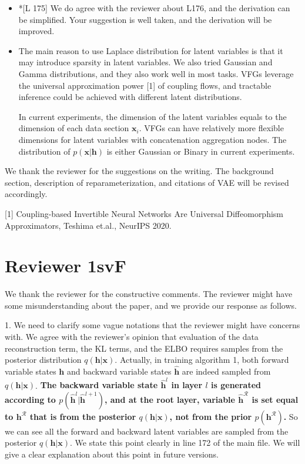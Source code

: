 \documentclass{article}
\begin{document}
\begin{itemize}
\item *[L 175] We do agree with the reviewer about L176, and the derivation can be simplified.  Your suggestion is well taken, and the derivation will be improved. 


\item The main reason to use Laplace distribution for latent variables is that it may introduce sparsity in latent variables. We also tried Gaussian and Gamma distributions, and they also work well in most tasks. VFGs leverage the universal approximation power [1] of coupling flows, and tractable inference could be achieved with different latent distributions. 

In current experiments, the dimension of the latent variables equals to the dimension of each data section $\mathbf{x}_i$. VFGs can have relatively more flexible dimensions for latent variables with concatenation aggregation nodes.  The distribution of $p(\mathbf{x}|\mathbf{h})$ is either Gaussian or Binary in current experiments. 

\end{itemize}

We thank the reviewer for the suggestions on the writing. The background section, description of reparameterization, and citations of VAE will be revised accordingly. 


[1] Coupling-based Invertible Neural Networks Are Universal Diffeomorphism Approximators, Teshima et.al., NeurIPS 2020.

\section{Reviewer 1svF}

We thank the reviewer for the constructive comments. The reviewer might have some misunderstanding about the paper, and we provide our response as follows. 

1. We need to clarify some vague notations that the reviewer might have concerns with.    We agree with the reviewer's opinion that evaluation of the data reconstruction term, the KL terms, and the ELBO  requires samples from the posterior distribution $q(\mathbf{h}|\mathbf{x})$. 
Actually, in training algorithm 1, both forward variable states $\mathbf{h}$ and backward variable states  $\widehat{\mathbf{h}}$ are indeed sampled from $q(\mathbf{h}|\mathbf{x})$. \textbf{The backward variable state $\widehat{\mathbf{h}}^l$ in  layer $l$  is generated according to $p(\widehat{\mathbf{h}}^l | \widehat{\mathbf{h}}^{l+1})$, and at the root  layer,  variable $\widehat{\mathbf{h}}^{\mathcal{R}}$ is set  equal to  $\mathbf{h}^{\mathcal{R}}$ that is
from  the posterior $q(\mathbf{h}|\mathbf{x})$, not from the prior $p(\mathbf{h}^{\mathcal{R}})$.} So we can see all the forward and backward latent variables are sampled from the posterior $q(\mathbf{h}|\mathbf{x})$. 
We state this point clearly in line 172 of the main file. We will give a clear explanation about this point in future versions. 
\end{document}
